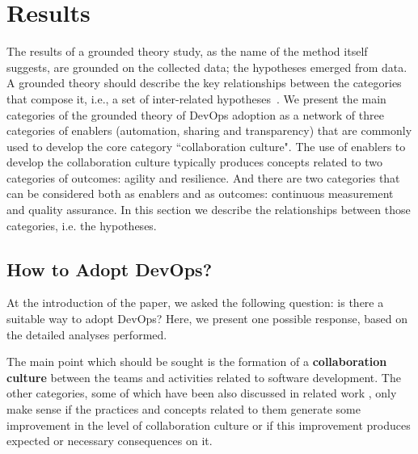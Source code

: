 \section{Results} \label{sec:results}
The results of a grounded theory study, as the name of the method itself suggests, are grounded on the collected data; the hypotheses emerged from data. A grounded theory should describe the key relationships between the categories that compose it, i.e., a set of inter-related hypotheses~\cite{hoda2017becoming}. We present the main categories of the grounded theory of DevOps adoption as a network of three categories of enablers (automation, sharing and transparency) that are commonly used to develop the core category ``collaboration culture". The use of enablers to develop the collaboration culture typically produces concepts related to two categories of outcomes: agility and resilience. And there are two categories that can be considered both as enablers and as outcomes: continuous measurement and quality assurance. In this section we describe the relationships between those categories, i.e. the hypotheses.

\subsection{How to Adopt DevOps?}
At the introduction of the paper, we asked the following question: is there a
suitable way to adopt DevOps? Here, we present one possible response, based
on the detailed analyses performed.

The main point
which should be sought is the formation of a \textbf{collaboration culture}
between the teams and activities
related to software development.
The other categories, some of which have been also discussed in related work
, only make sense if the practices and concepts related to them generate some improvement in the level of collaboration culture  or if this improvement produces expected or necessary consequences on it.

